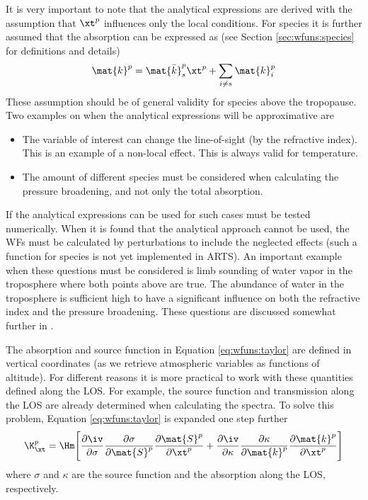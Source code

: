   It is very important to note that the analytical expressions are
  derived with the assumption that $\xt^p$ influences only the local
  conditions. For species it is further assumed that the absorption
  can be expressed as (see Section \ref{sec:wfuns:species} for
  definitions and details)
  \begin{equation}
   \mat{k}^p = \mat{\bar{k}}^p_s \xt^p + \sum_{i\ne s} \mat{k}^p_i
  \end{equation}
  These assumption should be of general validity
  for species above the tropopause. Two examples on when the
  analytical expressions will be approximative are
  \begin{itemize}
  \item The variable of interest can change the line-of-sight (by the
    refractive index). This is an example of a non-local effect. This
    is always valid for temperature.
  \item The amount of different species must be considered when
    calculating the pressure broadening, and not only the total
    absorption.
  \end{itemize}
  If the analytical expressions can be used for such cases must be
  tested numerically. When it is found that the analytical approach
  cannot be used, the WFs must be calculated by perturbations to
  include the neglected effects (such a function for species is not
  yet implemented in ARTS). An important example when these questions
  must be considered is limb sounding of water vapor in the
  troposphere where both points above are true. The abundance of water
  in the troposphere is sufficient high to have a significant
  influence on both the refractive index and the pressure broadening.
  These questions are discussed somewhat further in \citet{eriksson:01d}.

  The absorption and source function in Equation \ref{eq:wfuns:taylor}
  are defined in vertical coordinates (as we retrieve atmospheric
  variables as functions of altitude). For different reasons it is
  more practical to work with these quantities defined along the LOS.
  For example, the source function and transmission along the LOS are
  already determined when calculating the spectra. To solve this
  problem, Equation \ref{eq:wfuns:taylor} is expanded one step further
  \begin{equation}
    \K_{\xt}^p = \Hm \Bigg[ \frac{\partial\iv}{\partial \sigma}
                 \frac{\partial \sigma}{\partial \mat{S}^p} 
                 \frac{\partial \mat{S}^p}{\partial \xt^p} +
                 \frac{\partial\iv}{\partial \kappa}
                 \frac{\partial \kappa}{\partial \mat{k}^p}
                 \frac{\partial \mat{k}^p}{\partial \xt^p} \Bigg]
   \label{eq:wfuns:taylor2}
  \end{equation}
  where $\sigma$ and $\kappa$ are the source function and the absorption 
  along the LOS, respectively.
  
